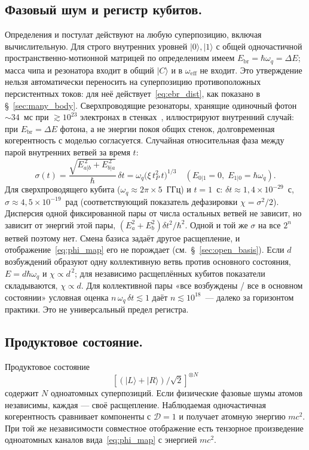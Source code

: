 \documentclass[12pt,a4paper]{article}
\begin{document}
\subsection{Фазовый шум и регистр кубитов.}
Определения и постулат действуют на любую суперпозицию, включая вычислительную. Для строго внутренних уровней $|0\rangle,|1\rangle$ с общей одночастичной пространственно-мотионной матрицей по определениям имеем $E_{\mathrm{br}}=\hbar\omega_q=\Delta E$; масса чипа и резонатора входит в общий $|C\rangle$ и в $\omega_{\mathrm{eff}}$ не входит. Это утверждение нельзя автоматически переносить на суперпозицию противоположных персистентных токов: для неё действует~\eqref{eq:ebr_dist}, как показано в \S~\ref{sec:many_body}. Сверхпроводящие резонаторы, хранящие одиночный фотон $\sim\!34$~мс при $\gtrsim10^{23}$ электронах в стенках~\cite{milul2023cavity}, иллюстрируют внутренний случай: при $E_{\mathrm{br}}=\Delta E$ фотона, а не энергии покоя общих стенок, долговременная когерентность с моделью согласуется. Случайная относительная фаза между парой внутренних ветвей за время $t$:
\begin{equation}
\sigma(t)=\frac{\sqrt{E_{a|b}^{\,2}+E_{b|a}^{\,2}}}{\hbar}\,\delta t
=\omega_q\bigl(\xi\,t_P^2\,t\bigr)^{1/3}
\quad (E_{0|1}=0,\;E_{1|0}=\hbar\omega_q).
\label{eq:sigmaq}
\end{equation}
Для сверхпроводящего кубита ($\omega_q\approx2\pi\times5$~ГГц) и $t=1$~с: $\delta t\approx1{,}4\times10^{-29}$~с, $\sigma\approx4{,}5\times10^{-19}$~рад (соответствующий показатель дефазировки $\chi=\sigma^2/2$). Дисперсия одной фиксированной пары от числа остальных ветвей не зависит, но зависит от энергий этой пары, $(E_a^2+E_b^2)\delta t^2/\hbar^2$. Одной и той же $\sigma$ на все $2^n$ ветвей поэтому нет. Смена базиса задаёт другое расщепление, и отображение~\eqref{eq:phi_map} его не порождает (см.~\S~\ref{sec:open_basis}). Если $d$ возбуждений образуют одну коллективную ветвь против основного состояния, $E=d\hbar\omega_q$ и $\chi\propto d^{\,2}$; для независимо расщеплённых кубитов показатели складываются, $\chi\propto d$. Для коллективной пары «все возбуждены / все в основном состоянии» условная оценка $n\,\omega_q\,\delta t\lesssim1$ даёт $n\lesssim10^{18}$~--- далеко за горизонтом практики. Это не универсальный предел регистра.

\subsection{Продуктовое состояние.}
Продуктовое состояние
\begin{equation}
\left[(|L\rangle+|R\rangle)/\sqrt2\right]^{\otimes N}
\end{equation}
содержит $N$ одноатомных суперпозиций. Если физические фазовые шумы атомов независимы, каждая --- своё расщепление. Наблюдаемая одночастичная когерентность сравнивает компоненты с $\mathcal D=1$ и получает атомную энергию $mc^2$. При той же независимости совместное отображение есть тензорное произведение одноатомных каналов вида~\eqref{eq:phi_map} с энергией $mc^2$.
\end{document}
